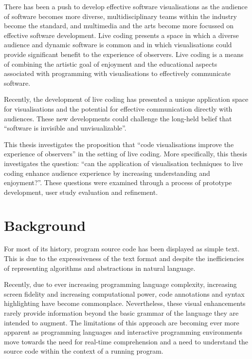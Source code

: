 There has been a push to develop effective software visualisations as the audience of software becomes more diverse, multidisciplinary teams within the industry become the standard, and multimedia and the arts become more focussed on effective software development. Live coding presents a space in which a diverse audience and dynamic software is common and in which visualisations could provide significant benefit to the experience of observers. Live coding is a means of combining the artistic goal of enjoyment and the educational aspects associated with programming with visualisations to effectively communicate software.

Recently, the development of live coding has presented a unique application space for visualisations and the potential for effective communication directly with audiences. These new developments could challenge the long-held belief that ``software is invisible and unvisualizable''.

This thesis investigates the proposition that ``code visualisations improve the experience of observers'' in the setting of live coding. More specifically, this thesis investigates the question: ``can the application of visualisation techniques to live coding enhance audience experience by increasing understanding and enjoyment?''. These questions were examined through a process of prototype development, user study evaluation and refinement.



\section{Background}

For most of its history, program source code has been displayed as simple text. This is due to the expressiveness of the text format and despite the inefficiencies of representing algorithms and abstractions in natural language.

Recently, due to ever increasing programming language complexity, increasing screen fidelity and increasing computational power, code annotations and syntax highlighting have become commonplace. Nevertheless, these visual enhancements rarely provide information beyond the basic grammar of the language they are intended to augment. The limitations of this approach are becoming ever more apparent as programming languages and interactive programming environments move towards the need for real-time comprehension and a need to understand the source code within the context of a running program.

